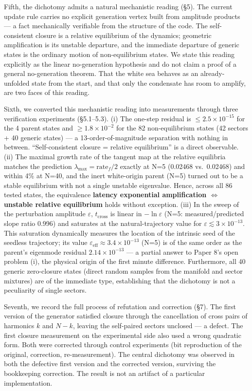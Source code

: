 \documentclass[
  a4paper,
]{article}
\begin{document}
Fifth, the dichotomy admits a natural mechanistic reading (§5). The
current update rule carries no explicit generation vertex built from
amplitude products --- a fact mechanically verifiable from the structure
of the code. The self-consistent closure is a relative equilibrium of
the dynamics; geometric amplification is its unstable departure, and the
immediate departure of generic states is the ordinary motion of
non-equilibrium states. We state this reading explicitly as the linear
no-generation hypothesis and do not claim a proof of a general
no-generation theorem. That the white sea behaves as an already-unfolded
state from the start, and that only the condensate has room to amplify,
are two faces of this reading.

Sixth, we converted this mechanistic reading into measurements through
three verification experiments (§5.1--5.3). (i) The one-step residual is
\(\le2.5\times10^{-15}\) for the 4 parent states and
\(\ge1.8\times10^{-2}\) for the 82 non-equilibrium states (42 sectors +
40 generic states) --- a 13-order-of-magnitude separation with nothing
in between. ``Self-consistent closure = relative equilibrium'' is a
direct observable. (ii) The maximal growth rate of the tangent map at
the relative equilibria matches the prediction
\(\lambda_{\max}=\text{rate}_f/2\) exactly at N=5 (0.02468 vs.~0.02468)
and within 4\% at N=40, and the inert white-origin parent (N=5) turned
out to be a stable equilibrium with not a single unstable eigenvalue.
Hence, across all 86 tested states, the equivalence \textbf{latency
exponential amplification \(\iff\) unstable relative equilibrium} holds
without exception. (iii) In the sweep of the perturbation amplitude
\(\varepsilon\), \(t_{\mathrm{cross}}\) is linear in \(-\ln\varepsilon\)
(N=5: measured/predicted slope ratio 0.996) and saturates at the
natural-trajectory value for \(\varepsilon\lesssim3\times10^{-13}\).
This saturation dynamically measures the location of the intrinsic seed
of the seedless trajectory; its value
\(\varepsilon_{\mathrm{eff}}\approx3.4\times10^{-13}\) (N=5) is of the
same order as the parent's eigenmode residual \(2.14\times10^{-13}\) ---
a partial answer to Paper 8's open problem (i), the physical origin of
the first minute difference. Furthermore, all 40 generic zero-closure
states (direct random samples from the manifold and sector mixtures) are
of the immediate type, establishing that the dichotomy is not a
peculiarity of single sectors.

Seventh, we record the full process of refutation and correction (§7).
The first version of the generator satisfied closure through the
cancellation of cross pairs of harmonics \(k\) and \(N-k\), leaving the
self-paired sectors unclosed --- a defect. The first closure measurement
on the experimental side also used a wrong quadratic form. Both were
corrected through control experiments (bit reproduction of the original,
correction, re-measurement). The central dichotomy was observed in both
the defective first version and the corrected version, surviving the
bookkeeping correction. The result is not an artifact of a particular
implementation.
\end{document}
